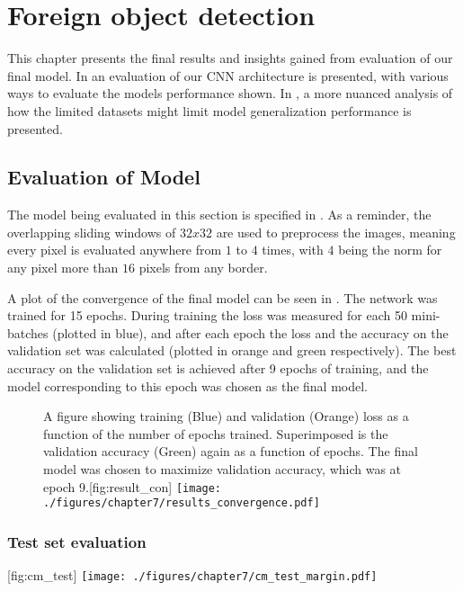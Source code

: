 \chapter{Foreign object detection} 
\label{chap:results}
This chapter presents the final results and insights gained from evaluation of our final model.
In  an evaluation of our \ac{CNN} architecture is presented, with various ways to evaluate the models performance shown.
In , a more nuanced analysis of how the limited datasets might limit model generalization performance is presented.

\section{Evaluation of Model}
\label{sec:evaluation}
The model being evaluated in this section is specified in .
As a reminder, the overlapping sliding windows of $32x32$ are used to preprocess the images, meaning every pixel is evaluated anywhere from $1$ to $4$ times, with $4$ being the norm for any pixel more than $16$ pixels from any border. 

A plot of the convergence of the final model can be seen in . The network was trained for 15 epochs. During training the loss was measured for each 50 mini-batches (plotted in blue), and after each epoch the loss and the accuracy on the validation set was calculated (plotted in orange and green respectively). The best accuracy on the validation set is achieved after 9 epochs of training, and the model corresponding to this epoch was chosen as the final model.

\begin{figure}[h]
	\begin{sidecaption}{A figure showing training (Blue) and validation (Orange) loss as a function of the number of epochs trained. Superimposed is the validation accuracy (Green) again as a function of epochs. The final model was chosen to maximize validation accuracy, which was at epoch 9.}[fig:result_con]
		\antimpjustification
		\centering
		\texttt{[image: ./figures/chapter7/results\_convergence.pdf]}
	\end{sidecaption}
\end{figure}

\subsection{Test set evaluation}
[fig:cm_test]
{\texttt{[image: ./figures/chapter7/cm\_test\_margin.pdf]}}

